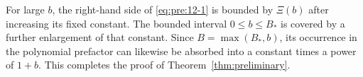For large \(b\), the right-hand side of \eqref{eq:pre:12-1} is bounded by \(\Xi(b)\) after increasing its fixed constant. The bounded interval \(0\leq b\leq B_*\) is covered by a further enlargement of that constant. Since \(B=\max(B_*,b)\), its occurrence in the polynomial prefactor can likewise be absorbed into a constant times a power of \(1+b\). This completes the proof of Theorem~\ref{thm:preliminary}.


